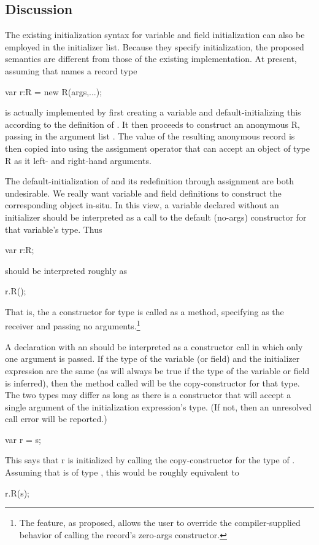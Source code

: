 \subsection{Discussion}

The existing initialization syntax for variable and field initialization can also be
employed in the initializer list.  Because they specify initialization, the
proposed semantics are different from those of the existing implementation.  At present,
assuming that  names a record type
\begin{chapel}
var r:R = new R(args,...);
\end{chapel}
\noindent
is actually implemented by first creating a variable  and default-initializing
this according to the definition of .  It then proceeds to construct an anonymous
R, passing in the argument list .  The value of the resulting anonymous
record is then copied into  using the assignment operator that can accept an
object of type R as it left- and right-hand arguments.

The default-initialization of  and its
redefinition through assignment are both undesirable.  We really want variable and field
definitions to construct the corresponding object in-situ.  In this view, a variable
declared without an initializer should be interpreted as a call to the default (no-args)
constructor for that variable's type.  Thus
\begin{chapel}
var r:R;
\end{chapel}
\noindent
should be interpreted roughly as
\begin{chapel}
r.R();
\end{chapel}
That is, the a constructor for type  is called as a method, specifying  as
the receiver and passing no arguments.\footnote{The  feature, as proposed,
  allows the user to override the compiler-supplied behavior of calling the record's
  zero-args constructor.}

A declaration with an  should be interpreted as a constructor call
in which only one argument is passed.  If the type of the variable (or field) and the initializer
expression are the same (as will always be true if the type of the variable or field is
inferred), then the method called will be the copy-constructor for that type.  The two
types may differ as long as there is a constructor that will accept a single argument of
the initialization expression's type.  (If not, then an unresolved call error will be
reported.)
\begin{chapel}
var r = s;
\end{chapel}
This says that r is initialized by calling the copy-constructor for the type of .
Assuming that  is of type , this would be roughly equivalent to
\begin{chapel}
r.R(s);
\end{chapel}

